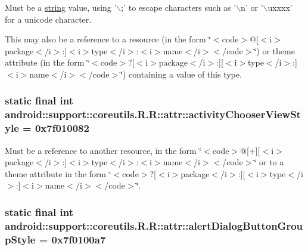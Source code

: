 Must be a \hyperlink{classandroid_1_1support_1_1coreutils_1_1_r_1_1string}{string} value, using '$\backslash$;' to escape characters such as '$\backslash$n' or '$\backslash$uxxxx' for a unicode character. 

This may also be a reference to a resource (in the form \char`\"{}$<$code$>$@\mbox{[}$<$i$>$package$<$/i$>$:\mbox{]}$<$i$>$type$<$/i$>$:$<$i$>$name$<$/i$>$$<$/code$>$\char`\"{}) or theme attribute (in the form \char`\"{}$<$code$>$?\mbox{[}$<$i$>$package$<$/i$>$:\mbox{]}\mbox{[}$<$i$>$type$<$/i$>$:\mbox{]}$<$i$>$name$<$/i$>$$<$/code$>$\char`\"{}) containing a value of this type. \hypertarget{classandroid_1_1support_1_1coreutils_1_1_r_1_1attr_f6078a1eff17e4ae15eb3a7b7c698025}{
\subsubsection[{activityChooserViewStyle}]{\setlength{\rightskip}{0pt plus 5cm}static final int android::support::coreutils.R.R::attr::activityChooserViewStyle = 0x7f010082}}
\label{classandroid_1_1support_1_1coreutils_1_1_r_1_1attr_f6078a1eff17e4ae15eb3a7b7c698025}


Must be a reference to another resource, in the form \char`\"{}$<$code$>$@\mbox{[}+\mbox{]}\mbox{[}$<$i$>$package$<$/i$>$:\mbox{]}$<$i$>$type$<$/i$>$:$<$i$>$name$<$/i$>$$<$/code$>$\char`\"{} or to a theme attribute in the form \char`\"{}$<$code$>$?\mbox{[}$<$i$>$package$<$/i$>$:\mbox{]}\mbox{[}$<$i$>$type$<$/i$>$:\mbox{]}$<$i$>$name$<$/i$>$$<$/code$>$\char`\"{}. \hypertarget{classandroid_1_1support_1_1coreutils_1_1_r_1_1attr_f0cde740396136dbe2646efc444829ba}{
\subsubsection[{alertDialogButtonGroupStyle}]{\setlength{\rightskip}{0pt plus 5cm}static final int android::support::coreutils.R.R::attr::alertDialogButtonGroupStyle = 0x7f0100a7}}
\label{classandroid_1_1support_1_1coreutils_1_1_r_1_1attr_f0cde740396136dbe2646efc444829ba}


